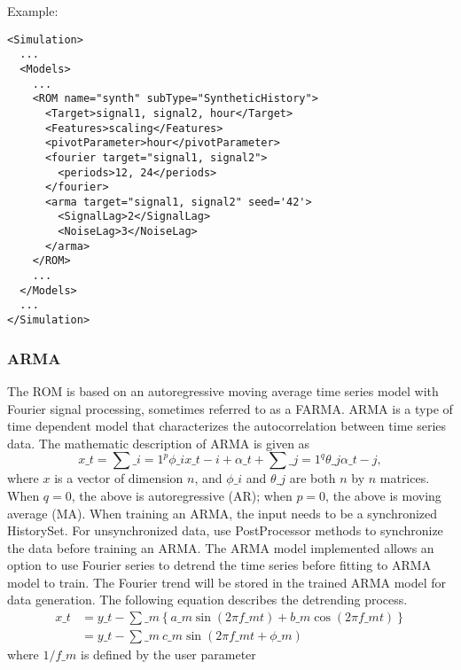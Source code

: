 \hspace{24pt}
Example:
\begin{lstlisting}[style=XML,morekeywords={name,subType,pivotLength,shift,target,threshold,period,width}]
<Simulation>
  ...
  <Models>
    ...
    <ROM name="synth" subType="SyntheticHistory">
      <Target>signal1, signal2, hour</Target>
      <Features>scaling</Features>
      <pivotParameter>hour</pivotParameter>
      <fourier target="signal1, signal2">
        <periods>12, 24</periods>
      </fourier>
      <arma target="signal1, signal2" seed='42'>
        <SignalLag>2</SignalLag>
        <NoiseLag>3</NoiseLag>
      </arma>
    </ROM>
    ...
  </Models>
  ...
</Simulation>
\end{lstlisting}


\subsubsection{ARMA}
  The  ROM is based on an autoregressive moving average time series model with
  Fourier signal processing, sometimes referred to as a FARMA.                         ARMA is a
  type of time dependent model that characterizes the autocorrelation between time series data. The
  mathematic description of ARMA is given as                         \begin{equation*}
  x\_t = \sum\_{i=1}^p\phi\_ix\_{t-i}+\alpha\_t+\sum\_{j=1}^q\theta\_j\alpha\_{t-j},
  \end{equation*}                         where $x$ is a vector of dimension $n$, and $\phi\_i$ and
  $\theta\_j$ are both $n$ by $n$ matrices. When $q=0$, the above is
  autoregressive (AR); when $p=0$, the above is moving average (MA).                         When
  training an ARMA, the input needs to be a synchronized HistorySet. For unsynchronized data, use
  PostProcessor methods to                         synchronize the data before training an ARMA.
  The ARMA model implemented allows an option to use Fourier series to detrend the time series
  before fitting to ARMA model to                         train. The Fourier trend will be stored in
  the trained ARMA model for data generation. The following equation
  describes the detrending                         process.
  \begin{equation*}                         \begin{aligned}                         x\_t &= y\_t -
  \sum\_m\left\{a\_m\sin(2\pi f\_mt)+b\_m\cos(2\pi f\_mt)\right\}  \\                         &=y\_t -
  \sum\_m\ c\_m\sin(2\pi f\_mt+\phi\_m)                         \end{aligned}
  \end{equation*}                         where $1/f\_m$ is defined by the user parameter
